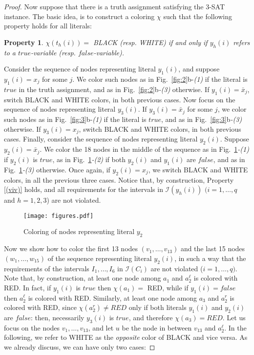 \documentclass[a4paper,11pt]{article}
\theoremstyle{theorem}
\newtheorem{property}[theorem]{Property}
\begin{document}
\begin{proof}
\smallskip
Now suppose that there is a truth assignment satisfying the 3-SAT instance. The basic idea, is to construct a coloring $\chi$ such that the following property holds for all literals: 



\begin{property}\label{(viv)}
$\chi(t_h(i)) =$ BLACK (resp. WHITE) if and only if $y_h(i)$ refers to a $true$-variable (resp. $false$-variable).
\end{property}

\smallskip
\noindent Consider the sequence of nodes representing literal $y_1(i)$, and suppose $y_1(i) = x_j$ for some $j$. We color such nodes as in Fig.~\ref{fig:2}b-\emph{(1)} if the literal is $true$ in the truth assignment, and as in Fig.~\ref{fig:2}b\emph{-(3)} otherwise. If $y_1(i) = \bar {x}_j$, switch BLACK and WHITE colors, in both previous cases. Now focus on the sequence of nodes representing literal $y_3(i)$. If $y_3(i) =\bar x_j$ for some $j$, we color such nodes as in Fig.~\ref{fig:3}b-\emph{(1)} if the literal is $true$, and as in Fig.~\ref{fig:3}b\emph{-(3)} otherwise. If $y_3(i) = {x}_j$, switch BLACK and WHITE colors, in both previous cases. Finally, consider the sequence of nodes representing literal $y_2(i)$. Suppose $y_2(i) = \bar x_j$. We color the 18 nodes in the middle of the sequence as in Fig.~\ref{fig:8}\emph{-(1)} if $y_2(i)$ is $true$, as in Fig.~\ref{fig:8}\emph{-(2)} if both $y_2(i)$ and $y_1(i) $ are $false$, and as in Fig.~\ref{fig:8}\emph{-(3)}  otherwise. Once again, if $y_2(i) = {x}_j$, we switch BLACK and WHITE colors, in all the previous three cases. Notice that, 
by construction, Property \eqref{(viv)} holds, and all requirements for the intervals in $\mathcal I(y_h(i))$ $(i=1, \dots, q$ and $h=1, 2, 3$) are not violated. 




\begin{figure}[htb]
\centering
\texttt{[image: figures.pdf]} 
\caption{Coloring of nodes representing literal $y_2$}
\label{fig:8}
\end{figure}



Now we show how to color the first 13 nodes $(v_1, \dots, v_{13})$ and the last 15 nodes $(w_1, \dots, w_{15})$ of the sequence representing literal $y_2(i)$, in such a way that the requirements of the intervals $I_1, \dots, I_6$ in $\mathcal I(C_i)$ are not violated ($i=1, \dots, q)$. Note that, by construction, at least one node among $a_1$ and $a_2^{\ell}$ is colored with RED. In fact, if $y_1(i)$ is $true$ then $\chi(a_1) =$ RED, while if $y_1(i) = false$ then $a_2^{\ell}$ is colored with RED. Similarly, at least one node among $a_3$ and $a_2^r$ is colored with RED, since $\chi(a_2^r) \neq RED$ only if both literals $y_1(i)$ and $y_2(i)$ are $false$: then, necessarily $y_3(i)$ is $true$, and therefore $\chi(a_3) = RED$. 
Let us focus on the nodes $v_1, \dots, v_{13}$, and let $u$ be the node in between $v_{13}$ and $a_2^{\ell}$. In the following, we refer to WHITE as the \emph{opposite} color of BLACK and vice versa. 
As we already discuss, we can have only two cases:


\end{proof}
\end{document}

